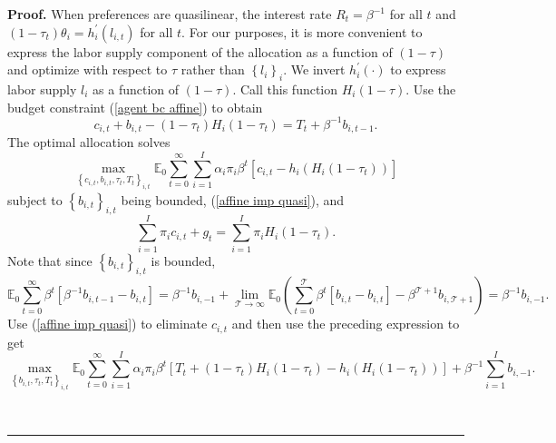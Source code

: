 \documentclass[thmsb,11pt]{article}
\newenvironment{proof}[1][Proof]{\noindent \textbf{#1.} }{\  \rule{0.5em}{0.5em}}
\begin{document}
\begin{proof}
When preferences are quasilinear, the interest rate $R_{t}=\beta
^{-1}$ for all $t$ and %
$\left( 1-\tau _{t}\right) \theta _{i}=h_{i}^{\prime }(l_{i,t})$ for all $%
t.$ For our purposes, it is more convenient to express the labor supply
component of the allocation as a function of $\left( 1-\tau \right) $ and
optimize with respect to $\tau $ rather than $\left\{ l_{i}\right\} _{i}.$
We  invert  $h_{i}^{\prime }(\cdot )$ to express labor supply $%
l_{i}$ as a function of $\left( 1-\tau \right) .$ Call this function $%
H_{i}\left( 1-\tau \right) $. Use the budget
constraint (\ref{agent bc affine}) to obtain
\begin{equation}
c_{i,t}+b_{i,t}-\left( 1-\tau _{t}\right) H_{i}\left( 1-\tau _{t}\right)
=T_{t}+\beta ^{-1}b_{i,t-1}.  \label{affine imp quasi}
\end{equation}%
The optimal allocation solves
\begin{equation}
\max_{\left\{ c_{i,t},b_{i,t},\tau_t,T_{t}\right\} _{i,t}}\mathbb{E}%
_{0}\sum_{t=0}^{\infty }\sum_{i=1}^{I}\alpha _{i}\pi _{i}\beta ^{t}\left[
c_{i,t}-h_{i}\left( H_{i}\left( 1-\tau_t \right) \right) \right]
\label{AMSS max}
\end{equation}%
subject to $\left\{ b_{i,t}\right\} _{i,t}$ being bounded, (\ref{affine imp
quasi}), and
\begin{equation*}
\sum_{i=1}^{I}\pi _{i}c_{i,t}+g_{t}=\sum_{i=1}^{I}\pi _{i} H_{i}\left( 1-\tau _{t}\right) .
\end{equation*}%
Note that since $\left\{ b_{i,t}\right\} _{i,t}$ is bounded,
\begin{equation*}
\mathbb{E}_{0}\sum_{t=0}^{\infty }\beta ^{t}\left[ \beta
^{-1}b_{i,t-1}-b_{i,t}\right] =\beta ^{-1}b_{i,-1}+\lim_{\mathcal{T}%
\rightarrow \infty }\mathbb{E}_{0}\left( \sum_{t=0}^{\mathcal{T}}\beta ^{t}%
\left[ b_{i,t}-b_{i,t}\right] -\beta ^{\mathcal{T}+1}b_{i,\mathcal{T}%
+1}\right) =\beta ^{-1}b_{i,-1}.
\end{equation*}%
Use (\ref{affine imp quasi}) to eliminate $c_{i,t}$ and then use  the preceding
expression  to get
\begin{equation}
\max_{\left\{ b_{i,t},\tau _{t},T_{t}\right\} _{i,t}}\mathbb{E}%
_{0}\sum_{t=0}^{\infty }\sum_{i=1}^{I}\alpha _{i}\pi _{i}\beta ^{t}\left[
T_{t}+\left( 1-\tau _{t}\right) H_{i}\left( 1-\tau _{t}\right) -h_{i}\left(
H_{i}\left( 1-\tau_t \right) \right) \right] +\beta
^{-1}\sum_{i=1}^{I}b_{i,-1}.  \label{quasilinear max}
\end{equation}%

\end{proof}
\end{document}
